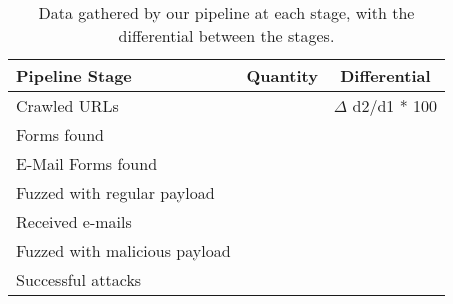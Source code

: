 \begin{table}[tbp]
	\centering
	\scriptsize
	\begin{tabular}{|l|c|c|}
		\hline
		\textbf{Pipeline Stage} & \textbf{Quantity} & \textbf{Differential}\\
		\hline
		Crawled URLs  & \urls & $\Delta$ d2/d1 * 100 \\
		\hline
		Forms found  & \forms & \formsDelta \\
		\hline
		E-Mail Forms found  & \emailforms & \emailformsDelta \\
		\hline
		Fuzzed with regular payload  & \fuzzed & \fuzzedDelta \\
		\hline
		Received e-mails  & \recd & \recdDelta \\
		\hline
		Fuzzed with malicious payload  & \malfuzzed & \malfuzzedDelta \\
		\hline
		Successful attacks  & \success & \successDelta \\
		\hline

	\end{tabular}
	\caption[]{Data gathered
      by our pipeline at each stage, with the differential between the
      stages.}
    \vspace{-5ex}
	\label{tab:pipeline}
\end{table}
